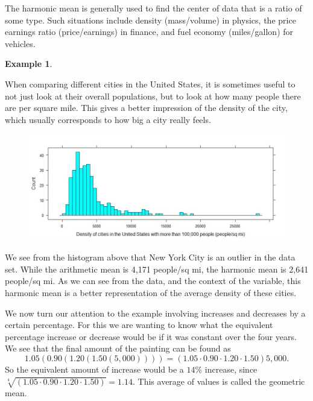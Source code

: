 \documentclass[
]{book}
\theoremstyle{definition}
\theoremstyle{definition}
\newtheorem{example}{Example}[chapter]
\theoremstyle{definition}
\theoremstyle{definition}
\theoremstyle{remark}
\begin{document}
The harmonic mean is generally used to find the center of data that is a ratio of some type. Such situations include density (mass/volume) in physics, the price earnings ratio (price/earnings) in finance, and fuel economy (miles/gallon) for vehicles.

\begin{example}
\protect\hypertarget{exm:unlabeled-div-294}{}\label{exm:unlabeled-div-294}

When comparing different cities in the United States, it is sometimes useful to not just look at their overall populations, but to look at how many people there are per square mile. This gives a better impression of the density of the city, which usually corresponds to how big a city really feels.\\

\begin{figure}

{\centering \includegraphics[width=0.98\linewidth]{images/city_density} 

}

\end{figure}

We see from the histogram above that New York City is an outlier in the data set. While the arithmetic mean is 4,171 people/sq mi, the harmonic mean is 2,641 people/sq mi. As we can see from the data, and the context of the variable, this harmonic mean is a better representation of the average density of these cities.

\end{example}

We now turn our attention to the example involving increases and decreases by a certain percentage. For this we are wanting to know what the equivalent percentage increase or decrease would be if it was constant over the four years. We see that the final amount of the painting can be found as
\[1.05(0.90(1.20(1.50(5,000))))= \left( 1.05 \cdot 0.90 \cdot 1.20 \cdot 1.50\right) 5,000.\] So the equivalent amount of increase would be a \(14\%\) increase, since \(\sqrt[4]{\left( 1.05 \cdot 0.90 \cdot 1.20 \cdot 1.50\right)}=1.14\). This average of values is called the geometric mean.
\end{document}
